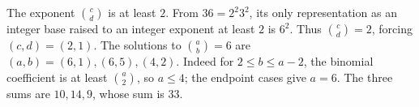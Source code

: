 The exponent $\binom cd$ is at least $2$. From $36=2^2 3^2$, its only representation as an integer base raised to an integer exponent at least $2$ is $6^2$. Thus $\binom cd=2$, forcing $(c,d)=(2,1)$. The solutions to $\binom ab=6$ are $(a,b)=(6,1),(6,5),(4,2)$. Indeed for $2\le b\le a-2$, the binomial coefficient is at least $\binom a2$, so $a\le4$; the endpoint cases give $a=6$. The three sums are $10,14,9$, whose sum is $\boxed{33}$.

